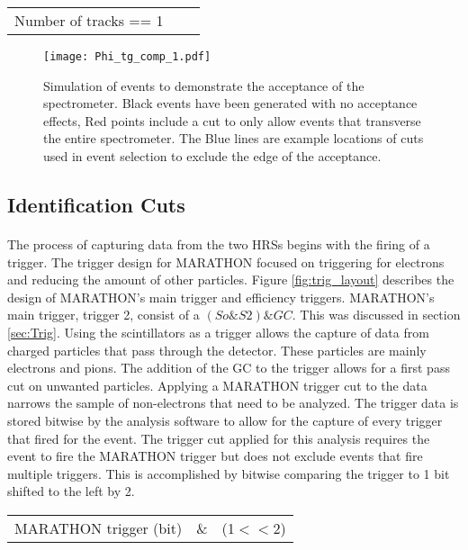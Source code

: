 \begin{tabular}{@{$\bullet$ }lll}
	Number of tracks == 1
\end{tabular}

\begin{figure}[]
	\centering

	\vspace*{-5pt}
	\texttt{[image: Phi\_tg\_comp\_1.pdf]}

	\caption{Simulation of events to demonstrate the acceptance of the spectrometer. Black events have been generated with no acceptance effects, Red points include a cut to only allow events that transverse the entire spectrometer. The Blue lines are example locations of cuts used in event selection to exclude the edge of the acceptance. }
	\label{phi_comp}
\end{figure}


\subsection{Identification Cuts}
\paragraph{} The process of capturing data from the two HRSs begins with the firing of a trigger. The trigger design for MARATHON focused on triggering for electrons and reducing the amount of other particles. Figure \ref{fig:trig_layout} describes the design of MARATHON's main trigger and efficiency triggers. MARATHON's main trigger, trigger 2, consist of a $(So \& S2) \& GC$. This was discussed in section \ref{sec:Trig}. Using the scintillators as a trigger allows the capture of data from charged particles that pass through the detector. These particles are mainly electrons and pions. The addition of the GC to the trigger allows for a first pass cut on unwanted particles. Applying a MARATHON trigger cut to the data narrows the sample of non-electrons that need to be analyzed. The trigger data is stored bitwise by the analysis software to allow for the capture of every trigger that fired for the event. The trigger cut applied for this analysis requires the event to fire the MARATHON trigger but does not exclude events that fire multiple triggers. This is accomplished by bitwise comparing the trigger to 1 bit shifted to the left by 2.  
   
\begin{tabular}{@{$\bullet$ }lll}
	MARATHON trigger (bit) &\& &(1$<<$2)
\end{tabular}

